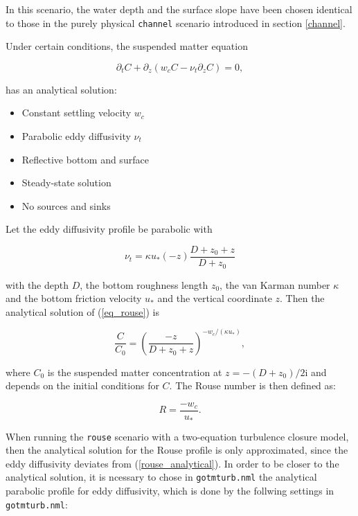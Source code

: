 In this scenario, the water depth and the surface slope have been
chosen identical to those in the purely physical
{\tt channel} scenario introduced in section \ref{channel}.

Under certain conditions, the suspended matter equation 

\begin{equation}\label{eq_rouse}
\partial_t C + \partial_z\left(w_c C - \nu_t \partial_z C\right) = 0,
\end{equation}

has an analytical solution:

\begin{itemize}
\item Constant settling velocity $w_c$
\item Parabolic eddy diffusivity $\nu_t$
\item Reflective bottom and surface
\item Steady-state solution
\item No sources and sinks
\end{itemize}

Let the eddy diffusivity profile be parabolic with

\begin{equation}
\nu_t = \kappa u_* (-z)\frac{D+z_0+z}{D+z_0}
\end{equation}

with the depth $D$, the bottom roughness length $z_0$, the van Karman
number $\kappa$ and the bottom friction velocity $u_*$ and the vertical
coordinate $z$.
Then the analytical solution of (\ref{eq_rouse}) is

\begin{equation}\label{rouse_analytical}
\displaystyle
\frac{C}{C_0} = \left(\frac{-z}{D+z_0+z} \right)^{-w_c/(\kappa u_*)},
\end{equation}

where $C_0$ is the suspended matter concentration at $z=-(D+z_0)/2$i
and depends on the initial conditions for $C$.
The Rouse number is then defined as:

\begin{equation}
R =\frac{-w_c}{u_*}.
\end{equation}

When running the {\tt rouse} scenario with a two-equation turbulence 
closure model, then the analytical solution for the Rouse profile 
is only approximated, since the eddy diffusivity deviates from 
(\ref{rouse_analytical}).
In order to be closer to the analytical solution, it is ncessary to chose in
{\tt gotmturb.nml} the analytical parabolic profile for eddy diffusivity,
which is done by the follwing settings in {\tt gotmturb.nml}:

